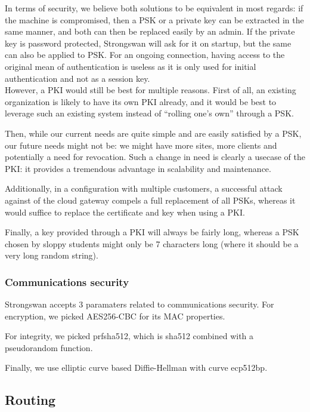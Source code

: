 \documentclass[paper=a4, fontsize=11pt]{scrartcl}
\begin{document}
In terms of security, we believe both solutions to be equivalent in most
regards: if the machine is compromised, then a PSK or a private key can be
extracted in the same manner, and both can then be replaced easily by an admin. 
If the private key is password protected, Strongswan will ask for it on startup,
but the same can also be applied to PSK\@.
For an ongoing connection, having access to the original mean of authentication
is useless as it is only used for initial authentication and not as a session
key.\\

However, a PKI would still be best for multiple reasons.
First of all, an existing organization is likely to have its own PKI already,
and it would be best to leverage such an existing system instead of ``rolling
one's own'' through a PSK\@.

Then, while our current needs are quite simple and are easily satisfied by a
PSK, our future needs might not be: we might have more sites, more clients and
potentially a need for revocation.
Such a change in need is clearly a usecase of the PKI\@: it provides a tremendous
advantage in scalability and maintenance.

Additionally, in a configuration with multiple customers, a successful attack
against of the cloud gateway compels a full replacement of all PSKs, whereas it
would suffice to replace the certificate and key when using a PKI\@.

Finally, a key provided through a PKI will always be fairly long,
whereas a PSK chosen by sloppy students might only be 7 characters long (where
it should be a very long random string).

\subsubsection{Communications security}

Strongswan accepts 3 paramaters related to communications security.
For encryption, we picked AES256-CBC for its MAC properties\@.

For integrity, we picked prfsha512, which is sha512 combined with a pseudorandom
function.

Finally, we use elliptic curve based Diffie-Hellman with curve ecp512bp.

\subsection{Routing}
\end{document}
